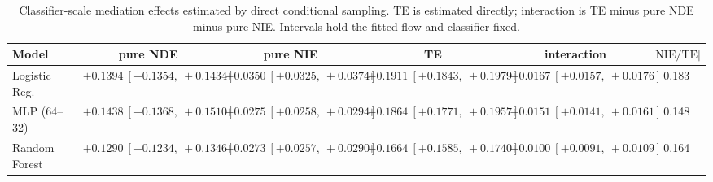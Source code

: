 \begin{table}[htbp]
  \centering
  \caption{Classifier-scale mediation effects estimated by direct conditional sampling. TE is estimated directly; interaction is TE minus pure NDE minus pure NIE. Intervals hold the fitted flow and classifier fixed.}
  \label{tab:adult_gap_overall}
  \begin{tabular}{lccccc}
    \toprule
    Model & pure NDE & pure NIE & TE & interaction & $|\mathrm{NIE}/\mathrm{TE}|$ \\
    \midrule
    Logistic Reg. & $+0.1394\ [+0.1354,\ +0.1434]$ & $+0.0350\ [+0.0325,\ +0.0374]$ & $+0.1911\ [+0.1843,\ +0.1979]$ & $+0.0167\ [+0.0157,\ +0.0176]$ & 0.183 \\
    MLP (64--32) & $+0.1438\ [+0.1368,\ +0.1510]$ & $+0.0275\ [+0.0258,\ +0.0294]$ & $+0.1864\ [+0.1771,\ +0.1957]$ & $+0.0151\ [+0.0141,\ +0.0161]$ & 0.148 \\
    Random Forest & $+0.1290\ [+0.1234,\ +0.1346]$ & $+0.0273\ [+0.0257,\ +0.0290]$ & $+0.1664\ [+0.1585,\ +0.1740]$ & $+0.0100\ [+0.0091,\ +0.0109]$ & 0.164 \\
    \bottomrule
  \end{tabular}
\end{table}